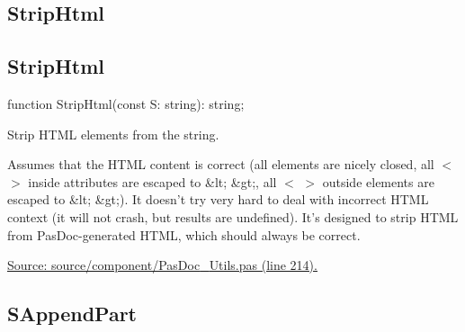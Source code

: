 \documentclass{report}
\newif\ifpdf
\begin{document}
\subsection*{\large{\textbf{StripHtml}}\normalsize\hspace{1ex}\hrulefill}
\else
\subsection*{StripHtml}
\fi
\label{PasDoc_Utils-StripHtml}
\begin{list}{}{
\setlength{\itemindent}{0cm}
\setlength{\listparindent}{0cm}
\setlength{\leftmargin}{\evensidemargin}
\addtolength{\leftmargin}{\tmplength}
\settowidth{\labelsep}{X}
\addtolength{\leftmargin}{\labelsep}
\setlength{\labelwidth}{\tmplength}
}
\item[\textbf{Declaration}\hfill]
\ifpdf
\begin{flushleft}
\fi
\begin{ttfamily}
function StripHtml(const S: string): string;\end{ttfamily}

\ifpdf
\end{flushleft}
\fi

\par
\item[\textbf{Description}]
Strip HTML elements from the string.

Assumes that the HTML content is correct (all elements are nicely closed, all {$<$} {$>$} inside attributes are escaped to {\&}lt; {\&}gt;, all {$<$} {$>$} outside elements are escaped to {\&}lt; {\&}gt;). It doesn't try very hard to deal with incorrect HTML context (it will not crash, but results are undefined). It's designed to strip HTML from PasDoc{-}generated HTML, which should always be correct.\par
\href{https://github.com/pasdoc/pasdoc/blob/master/source/component/PasDoc_Utils.pas#L214}{Source: source/component/PasDoc{\_}Utils.pas (line 214).}

\end{list}
\ifpdf
\subsection*{\large{\textbf{SAppendPart}}\normalsize\hspace{1ex}\hrulefill}
\else
\end{document}
